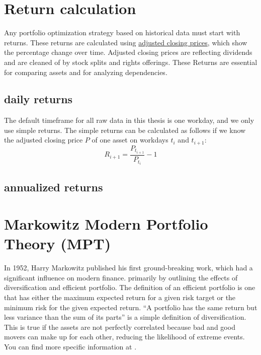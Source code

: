 \documentclass[
  oneside]{book}
\begin{document}
\hypertarget{return-calculation}{%
\section{Return calculation}\label{return-calculation}}

Any portfolio optimization strategy based on historical data must start with returns. These returns are calculated using \href{https://www.investopedia.com/terms/a/adjusted\%20closing\%20price.asp}{adjusted closing prices}, which show the percentage change over time. Adjusted closing prices are reflecting dividends and are cleaned of by stock splits and rights offerings. These Returns are essential for comparing assets and for analyzing dependencies.

\hypertarget{daily-returns}{%
\subsection{daily returns}\label{daily-returns}}

The default timeframe for all raw data in this thesis is one workday, and we only use simple returns. The simple returns can be calculated as follows if we know the adjusted closing price \(P\) of one asset on workdays \(t_i\) and \(t_{i+1}\):
\[
  R_{i+1} = \frac{P_{t_{i+1}}}{P_{t_i}}-1
\]

\hypertarget{annualized-returns}{%
\subsection{annualized returns}\label{annualized-returns}}

\hypertarget{markowitz-modern-portfolio-theory-mpt}{%
\section{Markowitz Modern Portfolio Theory (MPT)}\label{markowitz-modern-portfolio-theory-mpt}}

In 1952, Harry Markowitz published his first ground-breaking work, which had a significant influence on modern finance. primarily by outlining the effects of diversification and efficient portfolio. The definition of an efficient portfolio is one that has either the maximum expected return for a given risk target or the minimum risk for the given expected return. ``A portfolio has the same return but less variance than the sum of its parts'' is a simple definition of diversification. This is true if the assets are not perfectly correlated because bad and good movers can make up for each other, reducing the likelihood of extreme events. You can find more specific information at \citep{Mari2005}.
\end{document}
